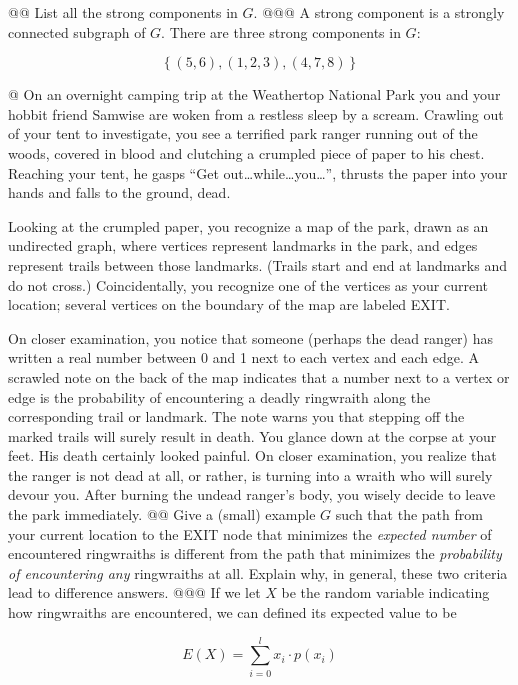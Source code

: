 \documentclass[10pt]{article}\usepackage[]{graphicx}\usepackage[]{xcolor}
\begin{document}
\begin{easylist}[enumerate]
    @@ List all the strong components in $G$.
    @@@ A strong component is a strongly connected subgraph of $G$. There are three strong components in $G$:

    \[
        \left\{ (5,6), (1,2,3), (4,7,8) \right\}
    \]

    @ On an overnight camping trip at the Weathertop National Park you and your hobbit friend Samwise are woken from a
    restless sleep by a scream. Crawling out of your tent to investigate, you see a terrified park ranger running out of
    the woods, covered in blood and clutching a crumpled piece of paper to his chest. Reaching your tent, he gasps ``Get
    out\ldots while\ldots you\ldots'', thrusts the paper into your hands and falls to the ground, dead.

    Looking at the crumpled paper, you recognize a map of the park, drawn as an undirected graph, where vertices
    represent landmarks in the park, and edges represent trails between those landmarks. (Trails start and end at
    landmarks and do not cross.) Coincidentally, you recognize one of the vertices as your current location; several
    vertices on the boundary of the map are labeled EXIT.

    On closer examination, you notice that someone (perhaps the dead ranger) has written a real number between 0 and 1
    next to each vertex and each edge. A scrawled note on the back of the map indicates that a number next to a vertex
    or edge is the probability of encountering a deadly ringwraith along the corresponding trail or landmark. The note
    warns you that stepping off the marked trails will surely result in death.  You glance down at the corpse at your
    feet. His death certainly looked painful. On closer examination, you realize that the ranger is not dead at all, or
    rather, is turning into a wraith who will surely devour you. After burning the undead ranger's body, you wisely
    decide to leave the park immediately.
    @@ Give a (small) example $G$ such that the path from your current location to the EXIT node that minimizes the
    \textit{expected number} of encountered ringwraiths is different from the path that minimizes the
    \textit{probability of encountering any} ringwraiths at all. Explain why, in general, these two criteria lead to
    difference answers.
    @@@ If we let $X$ be the random variable indicating how ringwraiths are encountered, we can defined its expected
    value to be

    \[
        E(X) = \sum_{i = 0}^l x_i \cdot p(x_i)
    \]


\end{easylist}
\end{document}
